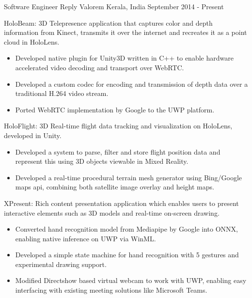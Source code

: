 \documentclass[11pt, a4paper]{awesome-cv}
\begin{document}
\begin{cventries}
	\cventry
	{Software Engineer} %
	{Reply Valorem} %
	{Kerala, India} %
	{September 2014 - Present} %
	{
		\begin{cvitems} %
			\item HoloBeam: 3D Telepresence application that captures color and depth information from Kinect, transmits it over the internet and recreates it as a point cloud in HoloLens.
				\begin{itemize} 
					\item Developed native plugin for Unity3D written in C++ to enable hardware accelerated video decoding and transport over WebRTC.
					\item Developed a custom codec for encoding and transmission of depth data over a traditional H.264 video stream.
					\item Ported WebRTC implementation by Google to the UWP platform.
				\end{itemize}
\vspace{1mm}
			\item HoloFlight: 3D Real-time flight data tracking and visualization on HoloLens, developed in Unity.
				\begin{itemize}
					\item Developed a system to parse, filter and store flight position data and represent this using 3D objects viewable in Mixed Reality.
					\item Developed a real-time procedural terrain mesh generator using Bing/Google maps api, combining both satellite image overlay and height maps.
				\end{itemize}
\vspace{1mm}
			\item XPresent: Rich content presentation application which enables users to present interactive elements such as 3D models and real-time on-screen drawing.
				\begin{itemize} 
					\item Converted hand recognition model from Mediapipe by Google into ONNX, enabling native inference on UWP via WinML.
					\item Developed a simple state machine for hand recognition with 5 gestures and experimental drawing support.
					\item Modified Directshow based virtual webcam to work with UWP, enabling easy interfacing with existing meeting solutions like Microsoft Teams.

\end{itemize}
\end{cvitems}}
\end{cventries}
\end{document}
